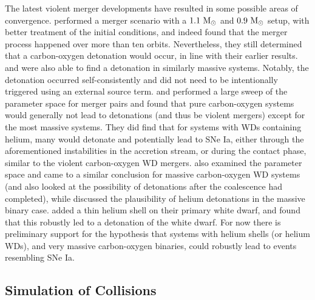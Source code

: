 \documentclass[12pt]{article}
\begin{document}
The latest violent merger developments have resulted in some possible areas of convergence.
\cite{pakmor:2012} performed a merger scenario
with a $1.1\ \mathrm{M}_\odot$ and $0.9\ \mathrm{M}_\odot$ setup, with better treatment
of the initial conditions, and indeed found that the merger process
happened over more than ten orbits. Nevertheless, they still determined
that a carbon-oxygen detonation would occur, in line with their
earlier results. \cite{moll:2014} and \cite{kashyap:2015} were also 
able to find a detonation in similarly massive systems. Notably,
the detonation occurred self-consistently and did not need to be  
intentionally triggered using an external source term.
\cite{dan:2012} and \cite{dan:2014} performed a large sweep 
of the parameter space for merger pairs and
found that pure carbon-oxygen systems would generally not lead to
detonations (and thus be violent mergers) except for the most massive
systems. They did find that for systems with WDs containing helium, many
would detonate and potentially lead to SNe Ia, either through the
aforementioned instabilities in the accretion stream, or during the
contact phase, similar to the violent carbon-oxygen WD
mergers. \cite{sato:2015} also examined the parameter space and
came to a similar conclusion for massive carbon-oxygen WD systems
(and also looked at the possibility of detonations after the
coalescence had completed), while \cite{tanikawa:2015} discussed
the plausibility of helium detonations in the massive binary case.
\cite{pakmor:2013} added a thin helium shell on their primary
white dwarf, and found that this robustly led to a detonation of the
white dwarf. For now there is preliminary support for the hypothesis
that systems with helium shells (or helium WDs), and very massive carbon-oxygen binaries,
could robustly lead to events resembling SNe Ia.

\subsection{Simulation of Collisions}
\label{sec:collision_simulations}
\end{document}

